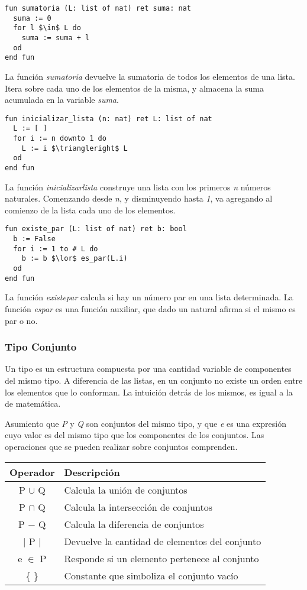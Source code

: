 \documentclass{article}
\begin{document}
\begin{lstlisting}
fun sumatoria (L: list of nat) ret suma: nat
  suma := 0
  for l $\in$ L do
    suma := suma + l
  od
end fun
\end{lstlisting}

La función \textit{sumatoria} devuelve la sumatoria de todos los elementos de una lista.
Itera sobre cada uno de los elementos de la misma, y almacena la suma acumulada en la variable \textit{suma}.

\begin{lstlisting}
fun inicializar_lista (n: nat) ret L: list of nat
  L := [ ]
  for i := n downto 1 do
    L := i $\triangleright$ L
  od
end fun
\end{lstlisting}

La función \textit{inicializar\gbajo lista} construye una lista con los primeros \textit{n} números naturales.
Comenzando desde \textit{n}, y disminuyendo hasta \textit{1}, va agregando al comienzo de la lista cada uno de los elementos.

\begin{lstlisting}
fun existe_par (L: list of nat) ret b: bool
  b := False
  for i := 1 to # L do
    b := b $\lor$ es_par(L.i)
  od
end fun
\end{lstlisting}

La función \textit{existe\gbajo par} calcula si hay un número par en una lista determinada.
La función \textit{es\gbajo par} es una función auxiliar, que dado un natural afirma si el mismo es par o no.

\subsubsection{Tipo Conjunto}

Un tipo  es un estructura compuesta por una cantidad variable de componentes del mismo tipo.
A diferencia de las listas, en un conjunto no existe un orden entre los elementos que lo conforman.
La intuición detrás de los mismos, es igual a la de matemática.

Asumiento que \textit{P} y \textit{Q} son conjuntos del mismo tipo, y que \textit{e} es una expresión cuyo valor es del mismo tipo que los componentes de los conjuntos.
Las operaciones que se pueden realizar sobre conjuntos comprenden.

\begin{center}
\begin{tabular}{| c | l |}
\hline
     Operador & Descripción \\
     \hline
     P $\cup$ Q & Calcula la unión de conjuntos \\
     P $\cap$ Q & Calcula la intersección de conjuntos \\
     P $-$ Q & Calcula la diferencia de conjuntos \\
     $|$ P $|$ & Devuelve la cantidad de elementos del conjunto \\
     e $\in$ P & Responde si un elemento pertenece al conjunto \\
     \{ \} & Constante que simboliza el conjunto vacío \\
\hline
\end{tabular}
\end{center}
\end{document}
